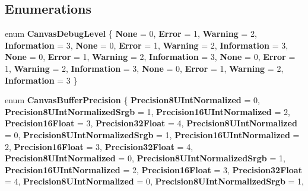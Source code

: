 \subsection*{Enumerations}
\begin{DoxyCompactItemize}
\item 
\mbox{\label{namespace_microsoft_1_1_graphics_1_1_canvas_a2ef0aec53b3f7fd6d2b7d2fe3f4cec34}} 
enum {\bfseries Canvas\+Debug\+Level} \{ \newline
{\bfseries None} = 0, 
{\bfseries Error} = 1, 
{\bfseries Warning} = 2, 
{\bfseries Information} = 3, 
\newline
{\bfseries None} = 0, 
{\bfseries Error} = 1, 
{\bfseries Warning} = 2, 
{\bfseries Information} = 3, 
\newline
{\bfseries None} = 0, 
{\bfseries Error} = 1, 
{\bfseries Warning} = 2, 
{\bfseries Information} = 3, 
\newline
{\bfseries None} = 0, 
{\bfseries Error} = 1, 
{\bfseries Warning} = 2, 
{\bfseries Information} = 3, 
\newline
{\bfseries None} = 0, 
{\bfseries Error} = 1, 
{\bfseries Warning} = 2, 
{\bfseries Information} = 3
 \}
\item 
\mbox{\label{namespace_microsoft_1_1_graphics_1_1_canvas_a9383a4c9a246b43c162a06fc29843c53}} 
enum {\bfseries Canvas\+Buffer\+Precision} \{ \newline
{\bfseries Precision8\+U\+Int\+Normalized} = 0, 
{\bfseries Precision8\+U\+Int\+Normalized\+Srgb} = 1, 
{\bfseries Precision16\+U\+Int\+Normalized} = 2, 
{\bfseries Precision16\+Float} = 3, 
\newline
{\bfseries Precision32\+Float} = 4, 
{\bfseries Precision8\+U\+Int\+Normalized} = 0, 
{\bfseries Precision8\+U\+Int\+Normalized\+Srgb} = 1, 
{\bfseries Precision16\+U\+Int\+Normalized} = 2, 
\newline
{\bfseries Precision16\+Float} = 3, 
{\bfseries Precision32\+Float} = 4, 
{\bfseries Precision8\+U\+Int\+Normalized} = 0, 
{\bfseries Precision8\+U\+Int\+Normalized\+Srgb} = 1, 
\newline
{\bfseries Precision16\+U\+Int\+Normalized} = 2, 
{\bfseries Precision16\+Float} = 3, 
{\bfseries Precision32\+Float} = 4, 
{\bfseries Precision8\+U\+Int\+Normalized} = 0, 
\newline
{\bfseries Precision8\+U\+Int\+Normalized\+Srgb} = 1, 

\end{DoxyCompactItemize}

